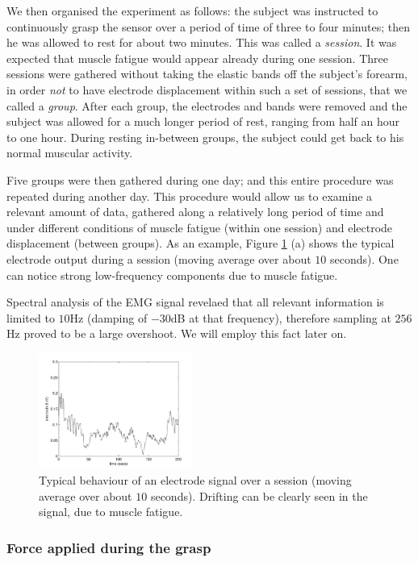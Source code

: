 We then organised the experiment as follows: the subject was
instructed to continuously grasp the sensor over a period of time of
three to four minutes; then he was allowed to rest for about two
minutes. This was called a \emph{session}. It was expected that muscle
fatigue would appear already during one session. Three sessions were
gathered without taking the elastic bands off the subject's forearm,
in order \emph{not} to have electrode displacement within such a set
of sessions, that we called a \emph{group}. After each group, the
electrodes and bands were removed and the subject was allowed for a
much longer period of rest, ranging from half an hour to one
hour. During resting in-between groups, the subject could get back to
his normal muscular activity.

Five groups were then gathered during one day; and this entire procedure was
repeated during another day. This procedure would allow us to
examine a relevant amount of data, gathered along a relatively long
period of time and under different conditions of muscle fatigue
(within one session) and electrode displacement (between groups). As
an example, Figure \ref{fig:drift} (a) shows the typical
electrode output during a session (moving average over about $10$
seconds). One can notice strong low-frequency components due to muscle
fatigue.

Spectral analysis of the EMG signal revelaed that all relevant
information is limited to $10$Hz (damping of $-30$dB at that
frequency), therefore sampling at $256$Hz proved to be a large
overshoot. We will employ this fact later on.

\begin{figure}[!ht] \centering
  \includegraphics[width=0.45\textwidth]{figs/el8_movingAvg_s1}
  \caption{Typical behaviour of an electrode signal over a
    session (moving average over about $10$ seconds). Drifting can be
    clearly seen in the signal, due to muscle fatigue.}
  \label{fig:drift}
\end{figure}

\subsubsection{Force applied during the grasp}

